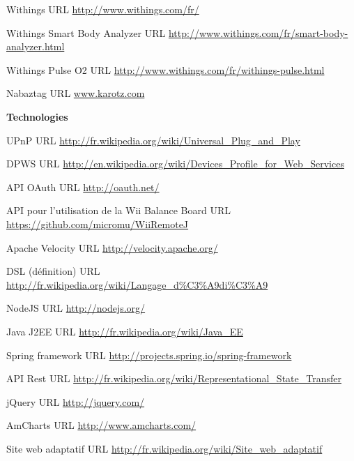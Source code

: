 \documentclass[nocopyrightspace]{sigplanconf}
\begin{document}
\begin{thebibliography}{10}
Withings
\newblock URL \url{http://www.withings.com/fr/}

Withings Smart Body Analyzer
\newblock URL \url{http://www.withings.com/fr/smart-body-analyzer.html}

Withings Pulse O2
\newblock URL \url{http://www.withings.com/fr/withings-pulse.html}

Nabaztag
\newblock URL \url{www.karotz.com}

\item[]\hspace{-\labelwidth}\hspace{-\labelsep}\textbf{Technologies}

UPnP
\newblock URL \url{http://fr.wikipedia.org/wiki/Universal_Plug_and_Play}

DPWS
\newblock URL \url{http://en.wikipedia.org/wiki/Devices_Profile_for_Web_Services}

API OAuth
\newblock URL \url{http://oauth.net/}

API pour l’utilisation de la Wii Balance Board
\newblock URL \url{https://github.com/micromu/WiiRemoteJ}

Apache Velocity
\newblock URL \url{http://velocity.apache.org/}

DSL (définition)
\newblock URL \url{http://fr.wikipedia.org/wiki/Langage_d%C3%A9di%C3%A9}

NodeJS
\newblock URL \url{http://nodejs.org/}

Java J2EE
\newblock URL \url{http://fr.wikipedia.org/wiki/Java_EE}

Spring framework
\newblock URL \url{http://projects.spring.io/spring-framework}

API Rest
\newblock URL \url{http://fr.wikipedia.org/wiki/Representational_State_Transfer}

jQuery
\newblock URL \url{http://jquery.com/}

AmCharts
\newblock URL \url{http://www.amcharts.com/}

Site web adaptatif
\newblock URL \url{http://fr.wikipedia.org/wiki/Site_web_adaptatif}


\end{thebibliography}
\end{document}
